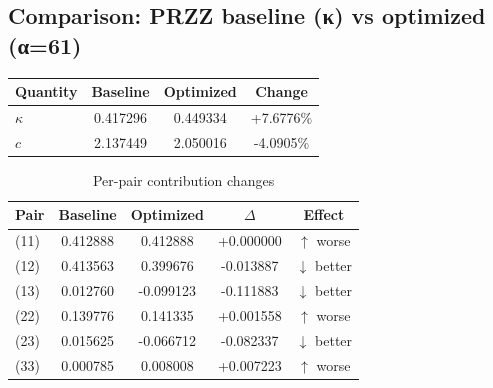 \subsection{Comparison: PRZZ baseline (κ) vs optimized (α=61)}

\begin{table}[h]
\centering
\begin{tabular}{lccc}
\hline
Quantity & Baseline & Optimized & Change \\
\hline
$\kappa$ & 0.417296 & 0.449334 & +7.6776\% \\
$c$ & 2.137449 & 2.050016 & -4.0905\% \\
\hline
\end{tabular}
\end{table}

\begin{table}[h]
\centering
\caption{Per-pair contribution changes}
\begin{tabular}{lcccc}
\hline
Pair & Baseline & Optimized & $\Delta$ & Effect \\
\hline
(11) & 0.412888 & 0.412888 & +0.000000 & $\uparrow$ worse \\
(12) & 0.413563 & 0.399676 & -0.013887 & $\downarrow$ better \\
(13) & 0.012760 & -0.099123 & -0.111883 & $\downarrow$ better \\
(22) & 0.139776 & 0.141335 & +0.001558 & $\uparrow$ worse \\
(23) & 0.015625 & -0.066712 & -0.082337 & $\downarrow$ better \\
(33) & 0.000785 & 0.008008 & +0.007223 & $\uparrow$ worse \\
\hline
\end{tabular}
\end{table}